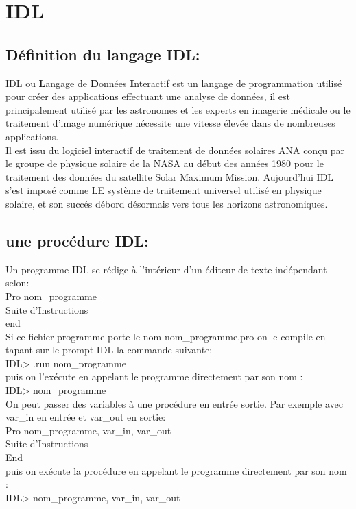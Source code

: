 \chapter{IDL}

\section{Définition du langage IDL:}

IDL ou \textbf{L}angage de \textbf{D}onnées \textbf{I}nteractif est un langage de programmation utilisé pour créer des applications effectuant une analyse de données, il est principalement utilisé par les astronomes et les experts en imagerie médicale ou le traitement d'image numérique nécessite une vitesse élevée dans de nombreuses applications.\\
Il est issu du logiciel interactif de traitement de données solaires ANA conçu par le groupe de physique solaire de la NASA au début des années 1980 pour le traitement des données du satellite Solar Maximum Mission. Aujourd'hui IDL s'est imposé comme LE système de traitement universel utilisé en physique solaire, et son succés débord désormais vers tous les horizons astronomiques.

 \section{une procédure IDL:}
 Un programme IDL se rédige à l’intérieur d'un éditeur de texte indépendant selon:\\
Pro nom\_programme\\
   Suite d’Instructions\\
end\\
Si ce fichier programme porte le nom nom\_programme.pro on le compile en tapant sur
le prompt IDL la commande suivante:\\
IDL> .run nom\_programme\\
puis on l’exécute en appelant le programme directement par son nom :\\
IDL> nom\_programme\\
On peut passer des variables à une procédure en entrée sortie. Par exemple avec var\_in
en entrée et var\_out en sortie:\\
Pro nom\_programme, var\_in, var\_out\\
  Suite d’Instructions\\
End\\
puis on exécute la procédure en appelant le programme directement par son nom :\\
IDL> nom\_programme, var\_in, var\_out


